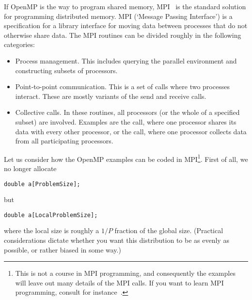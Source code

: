 
If OpenMP is the way to program shared memory,
\acf{MPI}~\cite{mpi-reference} is the standard solution for
programming distributed memory. MPI (`Message Passing Interface') is a
specification for a library interface for moving data
between processes that do
not otherwise share data. The MPI routines can be divided roughly in
the following categories:
\begin{itemize}
\item Process management. This includes querying the parallel
  environment and constructing subsets of processors.
\item Point-to-point communication. This is a set of calls where two processes
  interact. These are mostly variants of the send and receive calls.
\item{} Collective calls. In these
  routines, all processors (or the whole of a specified subset) are
  involved. Examples are the  call, where one
  processor shares its data with every other processor, or the
   call, where one processor collects data from all
  participating processors.
\end{itemize}

Let us consider how the OpenMP examples can be coded in
MPI\footnote{This is not a course in MPI programming, and consequently
  the examples will leave out many details of the MPI calls. If you
  want to learn MPI programming, consult for
  instance~\cite{Gropp:UsingMPI1}.}. First of all, we no longer allocate
\begin{verbatim}
double a[ProblemSize];
\end{verbatim}
but
\begin{verbatim}
double a[LocalProblemSize];
\end{verbatim}
where the local size is roughly a $1/P$ fraction of the global
size. (Practical considerations dictate whether you want this
distribution to be as evenly as possible, or rather biased in some
way.)

